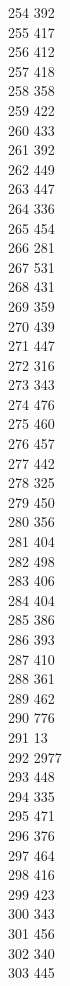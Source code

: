 { 254	392 \\
 255	417 \\
 256	412 \\
 257	418 \\
 258	358 \\
 259	422 \\
 260	433 \\
 261	392 \\
 262	449 \\
 263	447 \\
 264	336 \\
 265	454 \\
 266	281 \\
 267	531 \\
 268	431 \\
 269	359 \\
 270	439 \\
 271	447 \\
 272	316 \\
 273	343 \\
 274	476 \\
 275	460 \\
 276	457 \\
 277	442 \\
 278	325 \\
 279	450 \\
 280	356 \\
 281	404 \\
 282	498 \\
 283	406 \\
 284	404 \\
 285	386 \\
 286	393 \\
 287	410 \\
 288	361 \\
 289	462 \\
 290	776 \\
 291	13 \\
 292	2977 \\
 293	448 \\
 294	335 \\
 295	471 \\
 296	376 \\
 297	464 \\
 298	416 \\
 299	423 \\
 300	343 \\
 301	456 \\
 302	340 \\
 303	445 \\
}
